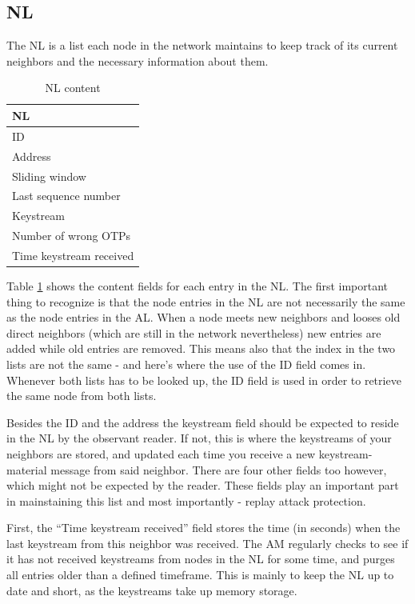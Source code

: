 \subsection{\acf{NL}}
The \acl{NL} is a list each node in the network maintains to keep track of its
current neighbors and the necessary information about them.
\begin{table}[h]
	\centering
	\begin{tabular}{| l |}\hline
 		\textbf{\acl{NL}}\\\hline
		ID\\\hline
		Address\\\hline
		Sliding window\\\hline 
		Last sequence number\\\hline 
		Keystream\\\hline
		Number of wrong OTPs\\\hline
		Time keystream received\\\hline
	\end{tabular}
	\caption{\acf{NL} content}
	\label{tab:nl_content}
\end{table}
Table \ref{tab:nl_content} shows the content fields for each entry in the
\ac{NL}. The first important thing to recognize is that the node entries in the
\ac{NL} are not necessarily the same as the node entries in the \ac{AL}. When a
node meets new neighbors and looses old direct neighbors (which are still in
the network nevertheless) new entries are added while old entries are removed.
This means also that the index in the two lists are not the same - and here's
where the use of the ID field comes in. Whenever both lists has to be looked up,
the ID field is used in order to retrieve the same node from both lists.

Besides the ID and the address the keystream field should be expected to reside
in the \ac{NL} by the observant reader. If not, this is where the keystreams of
your neighbors are stored, and updated each time you receive a new
keystream-material message from said neighbor. There are four other fields too
however, which might not be expected by the reader. These fields play an
important part in mainstaining this list and most importantly - replay attack
protection.

First, the ``Time keystream received'' field stores the time (in seconds) when
the last keystream from this neighbor was received. The \acl{AM} regularly
checks to see if it has not received keystreams from nodes in the \ac{NL} for
some time, and purges all entries older than a defined timeframe. This is mainly
to keep the \ac{NL} up to date and short, as the keystreams take up memory
storage.

